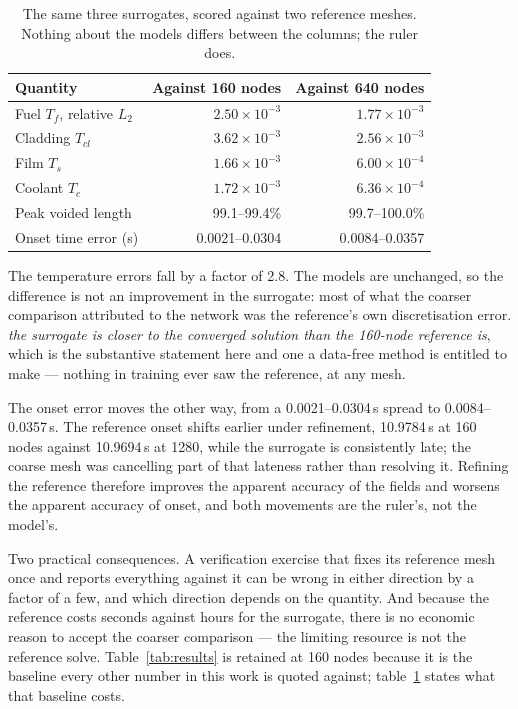 \documentclass[11pt,a4paper]{article}
\begin{document}
\begin{table}[tbp]
\caption{The same three surrogates, scored against two reference meshes. Nothing about the
models differs between the columns; the ruler does.}
\label{tab:meshsens}
\centering
\begin{tabular}{@{}lrr@{}}
\toprule
Quantity & Against 160 nodes & Against 640 nodes \\
\midrule
Fuel $T_f$, relative $L_2$      & $2.50\times10^{-3}$ & $1.77\times10^{-3}$ \\
Cladding $T_{cl}$               & $3.62\times10^{-3}$ & $2.56\times10^{-3}$ \\
Film $T_s$                      & $1.66\times10^{-3}$ & $6.00\times10^{-4}$ \\
Coolant $T_c$                   & $1.72\times10^{-3}$ & $6.36\times10^{-4}$ \\
Peak voided length              & 99.1--99.4\%        & 99.7--100.0\% \\
Onset time error (s)            & 0.0021--0.0304      & 0.0084--0.0357 \\
\bottomrule
\end{tabular}
\end{table}

The temperature errors fall by a factor of 2.8. The models are unchanged, so the difference
is not an improvement in the surrogate: most of what the coarser comparison attributed to
the network was the reference's own discretisation error. \emph{the surrogate is
closer to the converged solution than the 160-node reference is}, which is the substantive statement
here and one a data-free method is entitled to make --- nothing in training ever saw the
reference, at any mesh.

The onset error moves the other way, from a 0.0021--0.0304\,s spread to 0.0084--0.0357\,s.
The reference onset shifts earlier under refinement, 10.9784\,s at 160 nodes against
10.9694\,s at 1280, while the surrogate is consistently late; the coarse mesh was
cancelling part of that lateness rather than resolving it. Refining the reference therefore
improves the apparent accuracy of the fields and worsens the apparent accuracy of onset,
and both movements are the ruler's, not the model's.

Two practical consequences. A verification exercise that fixes its reference mesh once and
reports everything against it can be wrong in either direction by a factor of a few, and
which direction depends on the quantity. And because the reference costs seconds against
hours for the surrogate, there is no economic reason to accept the coarser comparison ---
the limiting resource is not the reference solve. Table~\ref{tab:results} is retained at
160 nodes because it is the baseline every other number in this work is quoted against;
table~\ref{tab:meshsens} states what that baseline costs.
\end{document}
